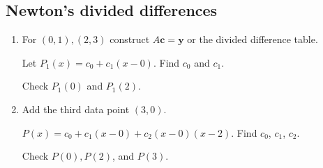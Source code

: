\documentclass[12pt,letterpaper,noanswers]{exam}
\begin{document}
\subsection*{Newton's divided differences}



\begin{enumerate}[resume]
\item For $(0,1), (2,3)$ construct $A\mathbf{c} = \mathbf{y}$ or the divided difference table.



Let $P_1(x) = c_0 + c_1(x-0)$.  Find $c_0$ and $c_1$.

Check $P_1(0)$ and $P_1(2)$.

\vspace{2in}

\item Add the third data point $(3,0)$.

$P(x) = c_0 + c_1(x-0) + c_2(x-0)(x-2)$.  Find $c_0$, $c_1$, $c_2$.

Check $P(0), P(2)$, and $P(3)$.
\end{enumerate}
\end{document}
